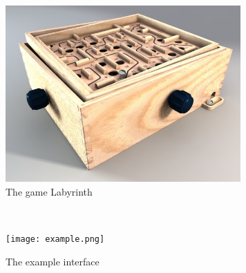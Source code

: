 \documentclass{article}
\begin{document}
\begin{figure}[ht!]
\centering
\includegraphics[width=90mm]{labyrinth.jpeg}
\caption{The game Labyrinth}
\label{overflow}
\end{figure}

\pagebreak
\


\begin{figure}[ht!]
\centering
\texttt{[image: example.png]}
\caption{The example interface}
\label{overflow}
\end{figure}
\end{document}
